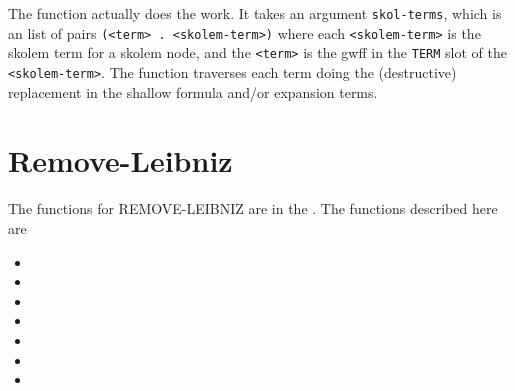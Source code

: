 The function 
actually does the work.
It takes an argument \verb+skol-terms+, which is
an list of pairs \verb+(<term> . <skolem-term>)+
where each \verb+<skolem-term>+ is the skolem term for
a skolem node, and the \verb+<term>+ is the gwff
in the \verb+TERM+ slot of the \verb+<skolem-term>+.
The function traverses each term doing the (destructive)
replacement
in the shallow formula and/or expansion terms.

\section{Remove-Leibniz}\label{remove-leibniz}

The functions for REMOVE-LEIBNIZ are in the {\it
{}}.  The functions
described here are
\begin{itemize}
\item {}
\item {}
\item {}
\item {}
\item {}
\item {}
\item {}
\end{itemize}

